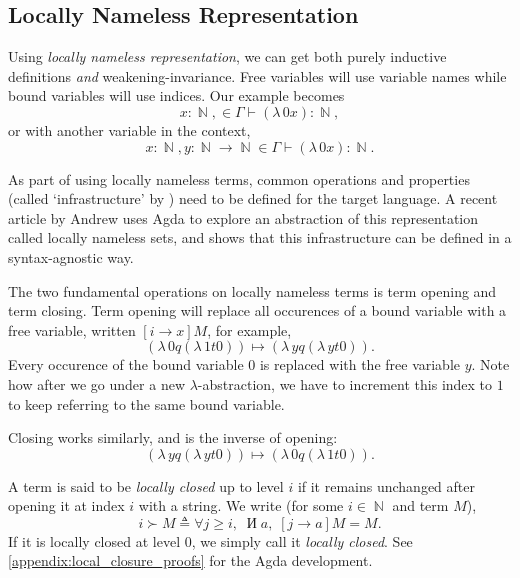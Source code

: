 \documentclass[logo,bsc,singlespacing,parskip,online]{infthesis}
\DeclareMathOperator{\nat}{\mathbb{N}}
\DeclareMathOperator{\cof}{\text{И}}
\begin{document}
\subsection{Locally Nameless Representation}
Using \textit{locally nameless representation}, we can get both purely inductive definitions
\textit{and} weakening-invariance. Free variables will use variable names while bound variables will
use indices. Our example becomes
\begin{equation*}
  x \colon \nat, \in \Gamma \vdash (\lambda \, 0 x) \colon \nat,
\end{equation*}
or with another variable in the context,
\begin{equation*}
  x \colon \nat, y \colon \nat \to \nat \in \Gamma \vdash (\lambda \, 0 x) \colon \nat.
\end{equation*}

As part of using locally nameless terms, common operations and properties (called `infrastructure'
by \citet{aydemir_engineering_2008}) need to be defined for the target language. A recent article by
Andrew \citet{pitts_locally_2023} uses Agda to explore an abstraction of this representation called
locally nameless sets, and shows that this infrastructure can be defined in a syntax-agnostic way.

The two fundamental operations on locally nameless terms is term opening and term closing. Term
opening will replace all occurences of a bound variable with a free variable, written $[i \to x] M$,
for example,
\begin{equation*}
  [0 \to y] (\lambda \, 0 q (\lambda \, 1 t 0)) \mapsto (\lambda \, y q (\lambda \, y t 0)).
\end{equation*}
Every occurence of the bound variable $0$ is replaced with the free variable $y$. Note how after we
go under a new $\lambda$-abstraction, we have to increment this index to $1$ to keep referring to
the same bound variable.

Closing works similarly, and is the inverse of opening:
\begin{equation*}
  [0 \rightarrow y] (\lambda \, y q (\lambda \, y t 0)) \mapsto (\lambda \, 0 q (\lambda \, 1 t 0)).
\end{equation*}

A term is said to be \textit{locally closed} up to level $i$ if it remains unchanged after opening
it at index $i$ with a string. We write (for some $i \in \nat$ and term $M$),
\begin{equation*}
  i \succ M \triangleq \forall j \geq i, \; \cof a , \; [j \to a] M = M.  
\end{equation*}
If it is locally closed at level $0$, we simply call it \textit{locally closed}. See
\ref{appendix:local_closure_proofs} for the Agda development.
\end{document}
